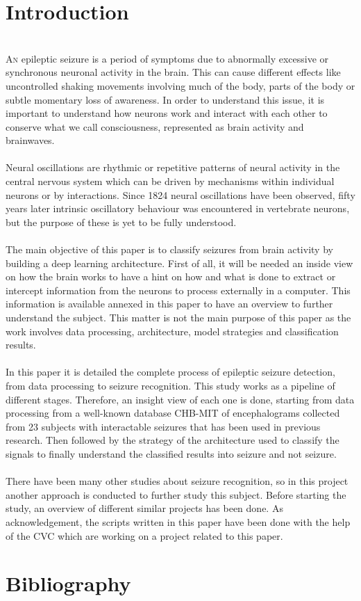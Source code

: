 ﻿\documentclass[10pt,a4paper,twocolumn,twoside]{article}
\begin{document}
\section{Introduction}
\leavevmode\\
\lettrine[lines=3]{A}{n} epileptic seizure is a period of symptoms due to abnormally excessive or synchronous neuronal activity in the brain. This can cause different effects like uncontrolled shaking movements involving much of the body, parts of the body or subtle momentary loss of awareness. In order to understand this issue, it is important to understand how neurons work and interact with each other to conserve what we call consciousness, represented as brain activity and brainwaves.
\\\\
Neural oscillations are rhythmic or repetitive patterns of neural activity in the central nervous system which can be driven by mechanisms within individual neurons or by interactions. Since 1824 neural oscillations have been observed, fifty years later intrinsic oscillatory behaviour was encountered in vertebrate neurons, but the purpose of these is yet to be fully understood.
\\\\
The main objective of this paper is to classify seizures from brain activity by building a deep learning architecture. First of all, it will be needed an inside view on how the brain works to have a hint on how and what is done to extract or intercept information from the neurons to process externally in a computer. This information is available annexed in this paper to have an overview to further understand the subject. This matter is not the main purpose of this paper as the work involves data processing, architecture, model strategies and classification results.
\\\\
In this paper it is detailed the complete process of epileptic seizure detection, from data processing to seizure recognition. This study works as a pipeline of different stages. Therefore, an insight view of each one is done, starting from data processing from a well-known database CHB-MIT of encephalograms collected from 23 subjects with interactable seizures that has been used in previous research. Then followed by the strategy of the architecture used to classify the signals to finally understand the classified results into seizure and not seizure.
\\\\
There have been many other studies about seizure recognition, so in this project another approach is conducted to further study this subject. Before starting the study, an overview of different similar projects has been done. As acknowledgement, the scripts written in this paper have been done with the help of the CVC which are working on a project related to this paper.








\section{Bibliography}
\label{sec-bibliography}

\printbibliography



\end{document}
